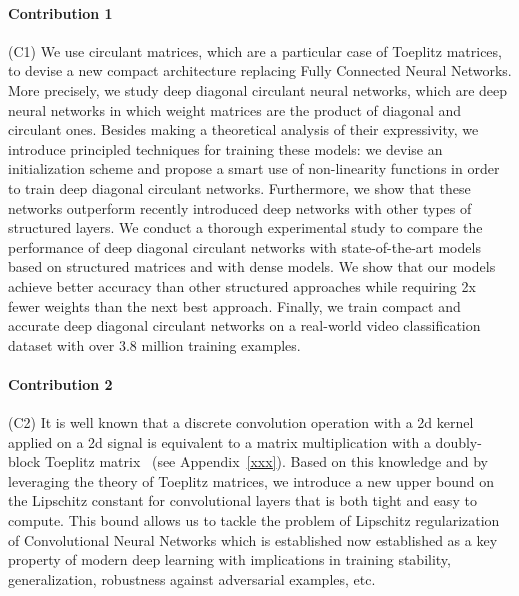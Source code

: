 \paragraph{Contribution 1} (C1)
We use circulant matrices, which are a particular case of Toeplitz matrices, to devise a new compact architecture replacing Fully Connected Neural Networks.
More precisely, we study deep diagonal circulant neural networks, which are deep neural networks in which weight matrices are the product of diagonal and circulant ones.
Besides making a theoretical analysis of their expressivity, we introduce principled techniques for training these models: we devise an initialization scheme and propose a smart use of non-linearity functions in order to train deep diagonal circulant networks. 
Furthermore, we show that these networks outperform recently introduced deep networks with other types of structured layers.
We conduct a thorough experimental study to compare the performance of deep diagonal circulant networks with state-of-the-art models based on structured matrices and with dense models.
We show that our models achieve better accuracy than other structured approaches while requiring 2x fewer weights than the next best approach.
Finally, we train compact and accurate deep diagonal circulant networks on a real-world video classification dataset with over 3.8 million training examples. 

\paragraph{Contribution 2} (C2)
It is well known that a discrete convolution operation with a 2d kernel applied on a 2d signal is equivalent to a matrix multiplication with a doubly-block Toeplitz matrix~\cite{jain1989fundamentals} (see Appendix~\ref{xxx}). 
Based on this knowledge and by leveraging the theory of Toeplitz matrices, we introduce a new upper bound on the Lipschitz constant for convolutional layers that is both tight and easy to compute.
This bound allows us to tackle the problem of Lipschitz regularization of Convolutional Neural Networks which is established now established as a key property of modern deep learning with implications in training stability, generalization, robustness against adversarial examples, etc.

%
%
%


